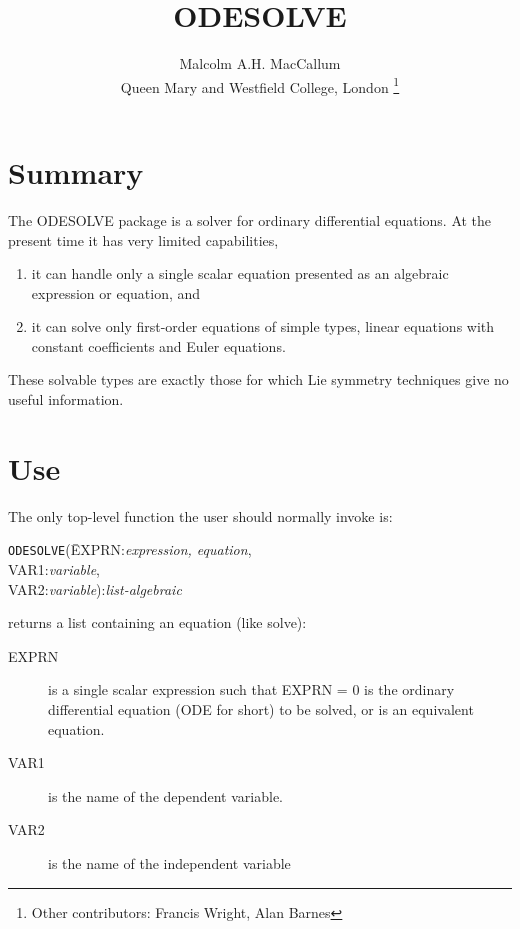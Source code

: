 \title{ODESOLVE}
\author{Malcolm A.H. MacCallum \\ Queen Mary and Westfield College, London
\thanks{Other contributors: Francis Wright, Alan Barnes}}

\date{}
\maketitle

\section{Summary}

The ODESOLVE package is a solver for ordinary differential equations.
At the present time it has very limited capabilities,

\begin{enumerate}
\item it can handle only a single scalar equation presented as an
algebraic expression or equation, and
\item it can solve only first-order equations of simple types,
linear equations with constant coefficients and Euler equations.
\end{enumerate}

\noindent These solvable types are exactly those for
which Lie symmetry techniques give no useful information.

\section{Use}
The only top-level function the user should normally invoke is:

\vspace{.1in}
\begin{tabbing}
{\tt ODESOLVE}(\=EXPRN:{\em expression, equation}, \\
\>VAR1:{\em variable}, \\
\>VAR2:{\em variable}):{\em list-algebraic}
\end{tabbing}
\vspace{.1in}

 returns a list containing an equation (like solve):

\begin{description}
\item[EXPRN] is a single scalar expression such that EXPRN = 0 is the
ordinary differential equation (ODE for short) to be solved,
or is an equivalent equation.
\item[VAR1] is the name of the dependent variable.
\item[VAR2] is the name of the independent variable
\end{description}

